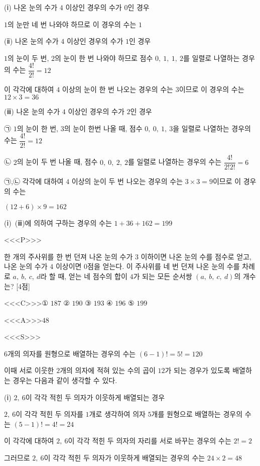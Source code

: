 \documentclass{oblivoir}
\begin{document}
(ⅰ) 나온 눈의 수가 $4$ 이상인 경우의 수가 $0$인 경우

$1$의 눈만 네 번 나와야 하므로 이 경우의 수는 $1$

(ⅱ) 나온 눈의 수가 $4$ 이상인 경우의 수가 $1$인 경우

$1$의 눈이 두 번, $2$의 눈이 한 번 나와야 하므로 점수 $0,\: 1,\: 1,\: 2$를 일렬로 나열하는 경우의 수는 $\dfrac{4!}{2!}=12$

이 각각에 대하여 $4$ 이상의 눈이 한 번 나오는 경우의 수는 $3$이므로 이 경우의 수는 $12\times 3=36$

(ⅲ) 나온 눈의 수가 $4$ 이상인 경우의 수가 $2$인 경우

㉠ $1$의 눈이 한 번, $3$의 눈이 한번 나올 때, 점수 $0,\: 0,\: 1,\: 3$을 일렬로 나열하는 경우의 수는 $\dfrac{4!}{2!}=12$

㉡ $2$의 눈이 두 번 나올 때, 점수 $0,\: 0,\: 2,\: 2$를 일렬로 나열하는 경우의 수는 $\dfrac{4!}{2!2!}=6$

㉠,㉡ 각각에 대하여 $4$ 이상의 눈이 두 번 나오는 경우의 수는 $3\times 3=9$이므로 이 경우의 수는

$(12+6)\times 9=162$

(ⅰ)~(ⅲ)에 의하여 구하는 경우의 수는 $1+36+162=199$

<<<P>>>

한 개의 주사위를 한 번 던져 나온 눈의 수가 $3$ 이하이면 나온 눈의 수를 점수로 얻고, 나온 눈의 수가 $4$ 이상이면 $0$점을 얻는다. 이 주사위를 네 번 던져 나온 눈의 수를 차례로 $a,\: b,\: c,\: d$라 할 때, 얻는 네 점수의 합이 $4$가 되는 모든 순서쌍 $(a,\: b,\: c,\: d)$의 개수는? [4점]

<<<C>>>① $187$ ② $190$ ③ $193$ ④ $196$ ⑤ $199$

<<<A>>>$48$

<<<S>>>

$6$개의 의자를 원형으로 배열하는 경우의 수는 $(6-1)! =5! = 120$

이때 서로 이웃한 $2$개의 의자에 적혀 있는 수의 곱이 $12$가 되는 경우가 있도록 배열하는 경우는 다음과 같이 생각할 수 있다.

(ⅰ) $2,\: 6$이 각각 적힌 두 의자가 이웃하게 배열되는 경우

$2,\: 6$이 각각 적힌 두 의자를 $1$개로 생각하여 의자 $5$개를 원형으로 배열하는 경우의 수는 $(5-1)! =4! =24$

이 각각에 대하여 $2,\: 6$이 각각 적힌 두 의자의 자리를 서로 바꾸는 경우의 수는 $2! =2$ 

그러므로 $2,\: 6$이 각각 적힌 두 의자가 이웃하게 배열되는 경우의 수는 $24\times 2=48$
\end{document}
